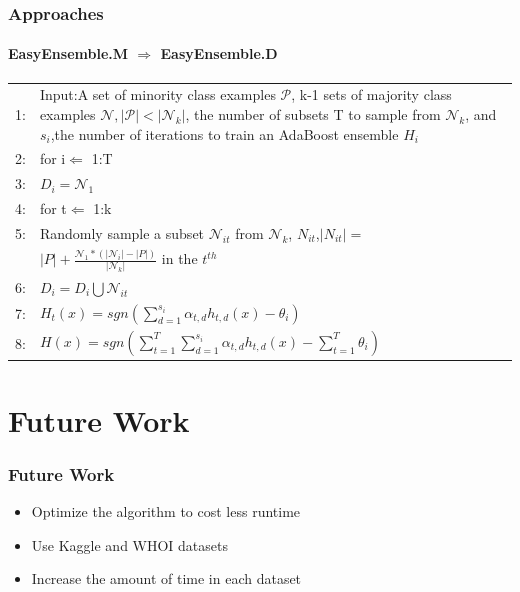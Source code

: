 \documentclass[11 pt,t]{beamer}
\newcommand{\footlineextra}[1]{\gdef\insertfootlineextra{#1}}
\begin{document}
\begin{frame}
\frametitle{Approaches}
\framesubtitle{EasyEnsemble.M $\Rightarrow$ EasyEnsemble.D}
\begin{table}[!ht]
\toprule
\begin{tabular}{l p{.88\linewidth}}
\midrule
1:&Input:A set of minority class examples $\mathcal{P}$, k-1 sets of majority class examples $\mathcal{N}, |\mathcal{P}|<|\mathcal{N}_{k}|$, the number of subsets T to sample from $\mathcal{N}_{k}$, and $s_{i}$,the number of iterations to train an AdaBoost ensemble $H_{i}$\\
2:&for i$\Leftarrow$ 1:T\\ 
3:&\qquad$D_{i}=\mathcal{N}_{1}$\\
4:&\qquad for t$\Leftarrow$ 1:k\\ 
5:&\qquad \qquad Randomly sample a subset $\mathcal{N}_{it}$ from $\mathcal{N}_{k}$, $N_{it}$,$|N_{it}|=$\\&\qquad \qquad$|P|+\frac{\mathcal{N}_{1}*\left(|\mathcal{N}_{i}|-|P|\right)}{|\mathcal{N}_{k}|}$ in the $t^{th}$\\
6:&\qquad \qquad $D_{i}=D_{i}\bigcup\mathcal{N}_{it}$\\
7:&\qquad$H_{t}\left(x\right)=sgn\left(\sum^{s_{i}}_{d=1}\alpha _{t,d}h_{t,d}\left(x\right)-\theta_{i}\right)$\\
8:&$H\left(x\right)=sgn\left(\sum^{T}_{t=1}\sum^{s_{i}}_{d=1}\alpha _{t,d}h_{t,d}\left(x\right)-\sum^{T}_{t=1}\theta_{i}\right)$\\

\end{tabular}
\end{table}
\footlineextra{Q.-Q.Li, and X.-Y.Liu. ”EasyEnsemble.M for multiclass imbalance
problem.” In: Pattern Recognition and Artificial Intelligence
27.2(2014):187-192.}
\end{frame}


\section{Future Work}
\begin{frame}
\frametitle{Future Work}
\begin{itemize}
\item Optimize the algorithm to cost less runtime
\item Use Kaggle and WHOI datasets
\item Increase the amount of time in each dataset
\end{itemize}

\end{frame}
\end{document}
